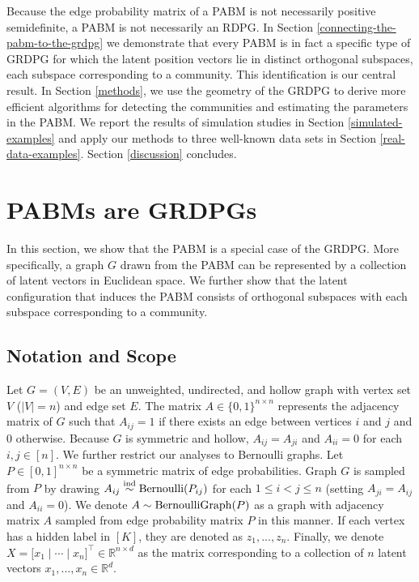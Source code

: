 \documentclass[12pt]{article}
\begin{document}
Because the edge probability matrix of a PABM is not necessarily
positive semidefinite, a PABM is not necessarily an RDPG.  In Section
\ref{connecting-the-pabm-to-the-grdpg} we demonstrate that every PABM
is in fact a specific type of GRDPG for which the latent position
vectors lie in distinct orthogonal subspaces, each subspace
corresponding to a community.  This identification is our central
result.  In Section \ref{methods}, we use the geometry of the GRDPG to
derive more efficient algorithms for detecting the communities and
estimating the parameters in the PABM.  We report the results of
simulation studies in Section \ref{simulated-examples} and apply our
methods to three well-known data sets in Section
\ref{real-data-examples}. Section \ref{discussion} concludes.

\hypertarget{connecting-the-popularity-adjusted-block-model-to-the-generalized-random-dot-product-graph}{%
\section{PABMs are GRDPGs}\label{connecting-the-popularity-adjusted-block-model-to-the-generalized-random-dot-product-graph}}

In this section, we show that the PABM is a special case of the GRDPG. 
More specifically, a graph $G$ drawn from the PABM can be represented by 
a collection of latent vectors in Euclidean space. 
We further show that the latent configuration that
induces the PABM consists of orthogonal subspaces with each subspace
corresponding to a community.

\hypertarget{notation}{%
\subsection{Notation and Scope}\label{notation}}

Let $G = (V, E)$ be an unweighted, undirected, 
and hollow graph with vertex set $V$ ($|V| = n$) and edge set $E$. The matrix
$A \in \{0, 1\}^{n \times n}$ represents the adjacency matrix of $G$ 
such that $A_{ij} = 1$ if there exists an edge between vertices $i$ and $j$ 
and $0$ otherwise. Because $G$ is symmetric and hollow,
$A_{ij} = A_{ji}$ and $A_{ii} = 0$ for each $i, j \in [n]$. 
We further restrict our analyses to Bernoulli graphs. 
Let $P \in [0, 1]^{n \times n}$ be a symmetric matrix of edge probabilities. 
Graph $G$ is sampled from $P$ by drawing $A_{ij} \stackrel{\mathrm{ind}}{\sim} \mathrm{Bernoulli}(P_{ij})$ 
for each $1 \leq i < j \leq n$ (setting $A_{ji} = A_{ij}$ and $A_{ii} = 0$). 
We denote $A \sim \mathrm{BernoulliGraph}(P)$ as a graph with adjacency matrix $A$ 
sampled from edge probability matrix $P$ in this manner. 
If each vertex has a hidden label in $[K]$, 
they are denoted as $z_1, ..., z_n$. 
Finally, we denote 
$X = \bigl[x_1 \mid \cdots \mid x_n\bigr]^\top \in \mathbb{R}^{n \times d}$ 
as the matrix corresponding to a collection of $n$ latent vectors $x_1, ..., x_n \in \mathbb{R}^d$.
\end{document}
